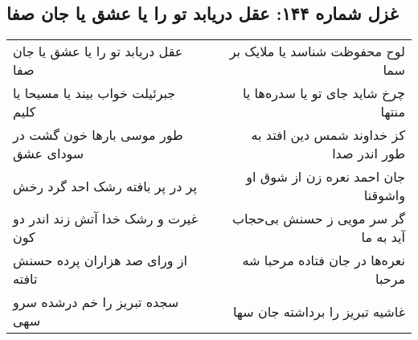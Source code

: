 \begin{center}
\section*{غزل شماره ۱۴۴: عقل دریابد تو را یا عشق یا جان صفا}
\label{sec:0144}
\begin{longtable}{l p{0.5cm} r}
عقل دریابد تو را یا عشق یا جان صفا
&&
لوح محفوظت شناسد یا ملایک بر سما
\\
جبرئیلت خواب بیند یا مسیحا یا کلیم
&&
چرخ شاید جای تو یا سدره‌ها یا منتها
\\
طور موسی بارها خون گشت در سودای عشق
&&
کز خداوند شمس دین افتد به طور اندر صدا
\\
پر در پر بافته رشک احد گرد رخش
&&
جان احمد نعره زن از شوق او واشوقنا
\\
غیرت و رشک خدا آتش زند اندر دو کون
&&
گر سر مویی ز حسنش بی‌حجاب آید به ما
\\
از ورای صد هزاران پرده حسنش تافته
&&
نعره‌ها در جان فتاده مرحبا شه مرحبا
\\
سجده تبریز را خم درشده سرو سهی
&&
غاشیه تبریز را برداشته جان سها
\\
\end{longtable}
\end{center}
